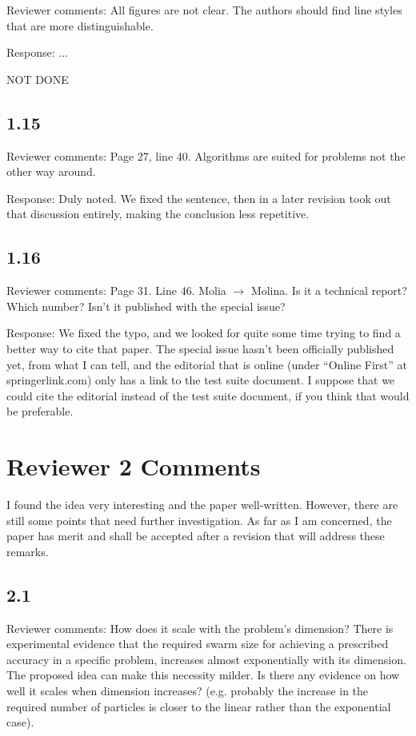 \documentclass[onecolumn, 12pt]{article}
\begin{document}
Reviewer comments: All figures are not clear. The authors should find line
styles that are more distinguishable.

Response: ...

NOT DONE

\subsection*{1.15}

Reviewer comments: Page 27, line 40. Algorithms are suited for problems not the
other way around.

Response: Duly noted.  We fixed the sentence, then in a later revision took out
that discussion entirely, making the conclusion less repetitive.

\subsection*{1.16}

Reviewer comments: Page 31. Line 46. Molia $\rightarrow$ Molina. Is it a
technical report?  Which number?  Isn't it published with the special issue?

Response:  We fixed the typo, and we looked for quite some time trying to find
a better way to cite that paper.  The special issue hasn't been officially
published yet, from what I can tell, and the editorial that is online (under
``Online First'' at springerlink.com) only has a link to the test suite
document.  I suppose that we could cite the editorial instead of the test suite
document, if you think that would be preferable.

\section*{Reviewer 2 Comments}

I found the idea very interesting and the paper well-written. However, there
are still some points that need further investigation.  As far as I am
concerned, the paper has merit and shall be accepted after a revision that will
address these remarks.

\subsection*{2.1}

Reviewer comments: How does it scale with the problem's dimension? There is
experimental evidence that the required swarm size for achieving a prescribed
accuracy in a specific problem, increases almost exponentially with its
dimension. The proposed idea can make this necessity milder. Is there any
evidence on how well it scales when dimension increases? (e.g. probably the
increase in the required number of particles is closer to the linear rather
than the exponential case).
\end{document}
